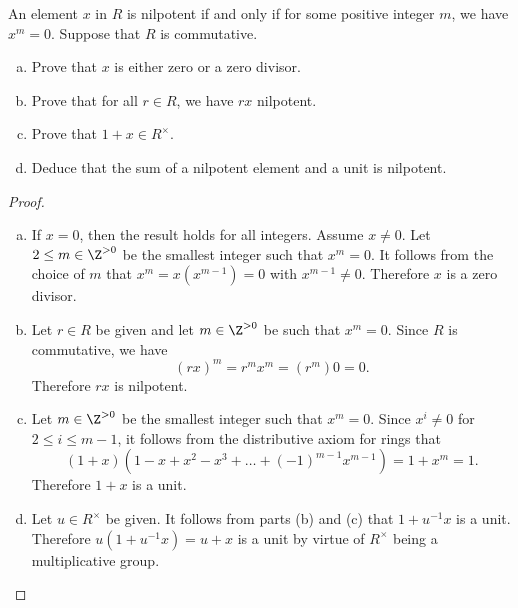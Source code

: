 \documentclass[10pt]{amsart}
\begin{document}
\begin{thm}
  An element $x$ in $R$ is nilpotent if and only if for some positive integer $m$, we have $x^m = 0$.
  Suppose that $R$ is commutative.
  \begin{enumerate}[(a)]
  \item
    Prove that $x$ is either zero or a zero divisor.
  \item
    Prove that for all $r \in R$, we have $rx$ nilpotent.
  \item
    Prove that $1 + x \in R^\times$.
  \item
    Deduce that the sum of a nilpotent element and a unit is nilpotent.
  \end{enumerate}
  \begin{proof}
    \begin{enumerate}[(a)]
    \item
      If $x = 0$, then the result holds for all integers.
      Assume $x \neq 0$.
      Let $2 \leq m \in \Z^{>0}$ be the smallest integer such that $x^m = 0$.
      It follows from the choice of $m$ that $x^m = x(x^{m-1}) = 0$ with $x^{m-1} \neq 0$.
      Therefore $x$ is a zero divisor.
    \item
      Let $r \in R$ be given and let $m \in \Z^{> 0}$ be such that $x^m = 0$.
      Since $R$ is commutative, we have 
      $$(rx)^m = r^mx^m = (r^m)0 = 0.$$
      Therefore $rx$ is nilpotent.
    \item
      Let $m \in \Z^{>0}$ be the smallest integer such that $x^m = 0$.
      Since $x^{i} \neq 0$ for $2 \leq i \leq m - 1$, it follows from the distributive axiom for rings that
      $$(1 + x)(1 - x + x^2 - x^3 + \ldots + (-1)^{m-1}x^{m-1}) = 1 + x^m = 1.$$
      Therefore $1+x$ is a unit.
    \item
      Let $u \in R^\times$ be given.
      It follows from parts (b) and (c) that $1 + u^{-1}x$ is a unit.
      Therefore $u(1 + u^{-1}x) = u + x$ is a unit by virtue of $R^\times$ being a multiplicative group.
    \end{enumerate}
  \end{proof}
\end{thm}
\end{document}
